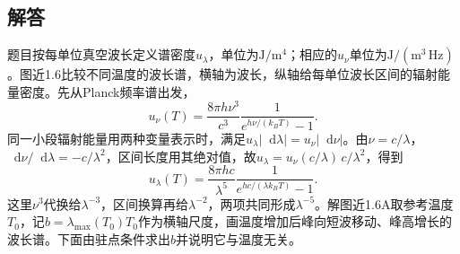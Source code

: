 \documentclass[UTF8,fontset=fandol,a4paper,11pt]{ctexart}
\newcommand{\dd}{\mathop{}\!\mathrm{d}}
\begin{document}
\subsection*{解答}


题目按每单位真空波长定义谱密度$u_\lambda$，单位为$\mathrm{J/m^4}$；相应的$u_\nu$单位为$\mathrm{J/(m^3\,Hz)}$。图近1.6比较不同温度的波长谱，横轴为波长，纵轴给每单位波长区间的辐射能量密度。先从Planck频率谱出发，
\[
u_\nu(T)=\frac{8\pi h\nu^3}{c^3}\frac1{e^{h\nu/(k_BT)}-1}.
\]
同一小段辐射能量用两种变量表示时，满足$u_\lambda|\dd\lambda|=u_\nu|\dd\nu|$。由$\nu=c/\lambda$，$\dd\nu/\dd\lambda=-c/\lambda^2$，区间长度用其绝对值，故$u_\lambda=u_\nu(c/\lambda)\,c/\lambda^2$，得到
\[
u_\lambda(T)=\frac{8\pi hc}{\lambda^5}
\frac1{e^{hc/(\lambda k_BT)}-1}.
\]
这里$\nu^3$代换给$\lambda^{-3}$，区间换算再给$\lambda^{-2}$，两项共同形成$\lambda^{-5}$。解图近1.6A取参考温度$T_0$，记$b=\lambda_{\max}(T_0)T_0$作为横轴尺度，画温度增加后峰向短波移动、峰高增长的波长谱。下面由驻点条件求出$b$并说明它与温度无关。
\end{document}
